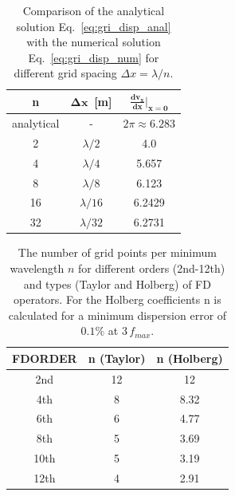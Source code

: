 \begin{table}[hbt]
\caption{\label{grid_disp.1} Comparison of the analytical solution Eq.~\ref{eq:gri_disp_anal} with the numerical solution Eq.~\ref{eq:gri_disp_num} for different grid spacing $\Delta x = \lambda /n$.}
\centering
\begin{tabular}{c|c|c}
    \textbf{n} &  \textbf{$\mathbf{\Delta x}\,$ [m]} & \textbf{$\mathbf{\frac{d v_x}{d x}|_{x=0}}$} \\ \hline 
    analytical & - & $2\pi \approx 6.283$ \\ 
    2 & $\lambda/2$ & 4.0 \\ 
    4 & $\lambda/4$ & 5.657 \\ 
    8 & $\lambda/8$ & 6.123 \\ 
    16 & $\lambda/16$ & 6.2429 \\ 
    32 & $\lambda/32$ & 6.2731
\end{tabular}
\end{table}
 
\begin{table}[hbt]
\caption{\label{grid_disp.2} The number of grid points per minimum wavelength $n$ for different orders (2nd-12th) and types (Taylor and Holberg) of FD operators. For the Holberg coefficients n is calculated for a minimum dispersion error of $0.1\%$ at $3\,f_{max}$.}
\centering
\begin{tabular}{c|c|c}
    \textbf{FDORDER} & \textbf{n (Taylor)} & \textbf{n (Holberg)} \\ \hline 
    2nd   &   12       &  12         \\
    4th   &   8        &  8.32       \\
    6th   &   6        &  4.77       \\
    8th   &   5        &  3.69       \\ 
    10th  &   5        &  3.19       \\
    12th  &   4        &  2.91       
\end{tabular}
\end{table} 

